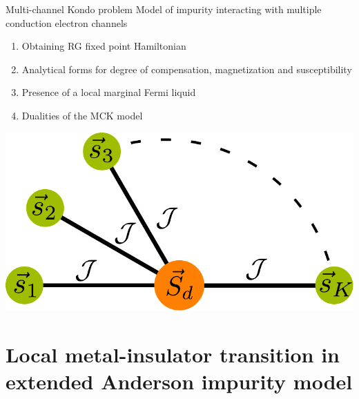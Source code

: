 \documentclass[11pt,aspectratio=169]{beamer}
\begin{document}
\begin{frame}{Multi-channel Kondo problem}
Model of impurity interacting with multiple conduction electron channels \\[20pt]

\begin{minipage}{0.59\textwidth}
	\begin{enumerate}
		\item Obtaining RG fixed point Hamiltonian\\[20pt]
	\item Analytical forms for degree of compensation, magnetization and susceptibility\\[20pt]
	\item Presence of a local marginal Fermi liquid\\[20pt]
	\item Dualities of the MCK model
\end{enumerate}
\end{minipage}
\begin{minipage}{0.4\textwidth}
	\includegraphics[width=\textwidth]{stargraph.pdf}
\end{minipage}

\end{frame}

\section{Local metal-insulator transition in extended Anderson impurity model}
\end{document}
